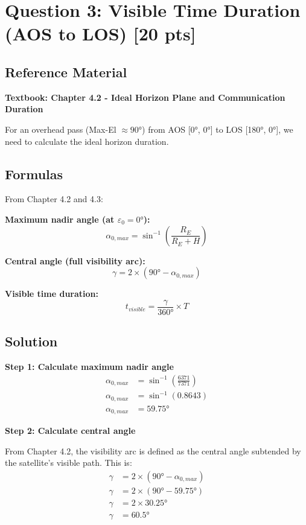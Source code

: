 \documentclass[11pt,letterpaper]{article}
\begin{document}
\section{Question 3: Visible Time Duration (AOS to LOS) [20 pts]}

\subsection{Reference Material}
\textbf{Textbook: Chapter 4.2 - Ideal Horizon Plane and Communication Duration}

For an overhead pass (Max-El $\approx 90°$) from AOS [0°, 0°] to LOS [180°, 0°], we need to calculate the ideal horizon duration.

\subsection{Formulas}
From Chapter 4.2 and 4.3:

\textbf{Maximum nadir angle (at $\varepsilon_0 = 0°$):}
\begin{equation}
\alpha_{0,max} = \sin^{-1}\left(\frac{R_E}{R_E + H}\right)
\end{equation}

\textbf{Central angle (full visibility arc):}
\begin{equation}
\gamma = 2 \times (90° - \alpha_{0,max})
\end{equation}

\textbf{Visible time duration:}
\begin{equation}
t_{visible} = \frac{\gamma}{360°} \times T
\end{equation}

\subsection{Solution}
\textbf{Step 1: Calculate maximum nadir angle}
\begin{align}
\alpha_{0,max} &= \sin^{-1}\left(\frac{6371}{7371}\right) \\
\alpha_{0,max} &= \sin^{-1}(0.8643) \\
\alpha_{0,max} &= 59.75°
\end{align}

\textbf{Step 2: Calculate central angle}

From Chapter 4.2, the visibility arc is defined as the central angle subtended by the satellite's visible path. This is:
\begin{align}
\gamma &= 2 \times (90° - \alpha_{0,max}) \\
\gamma &= 2 \times (90° - 59.75°) \\
\gamma &= 2 \times 30.25° \\
\gamma &= 60.5°
\end{align}
\end{document}
